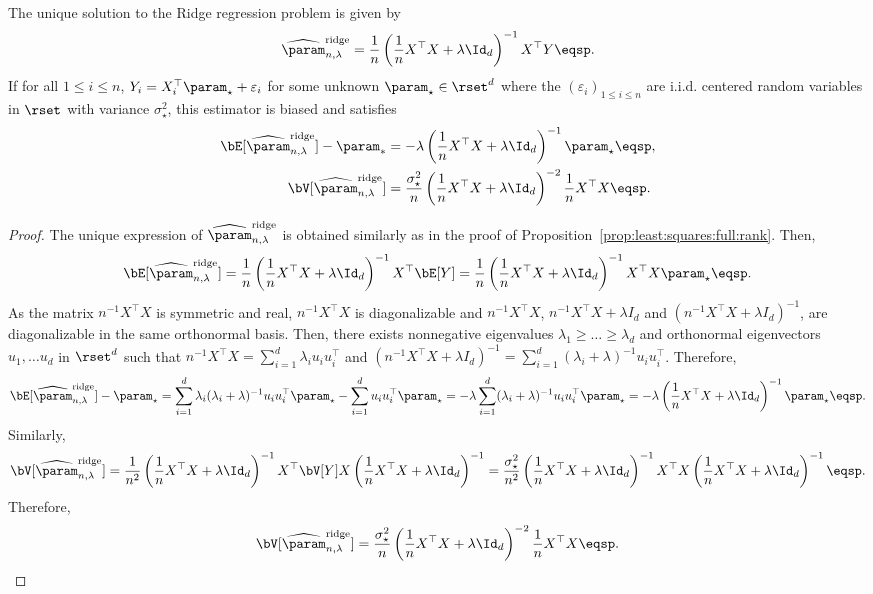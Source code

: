 \begin{shaded}
\begin{proposition}
\label{prop:least:squares:ridge}
The unique solution to the Ridge regression problem is given by
\[
\widehat \param^{\mathrm{ridge}}_{n,\lambda} = \frac{1}{n}\left(\frac{1}{n}X^\top X + \lambda \Id_d\right)^{-1}X^\top Y\eqsp.
\] 
If for all $1\leqslant i \leqslant n$, $Y_i = X^\top_i \param_{\star} + \varepsilon_i$ for some unknown $\param_\star\in\rset^d$ where the $(\varepsilon_i)_{1\leqslant i\leqslant n}$ are i.i.d. centered random variables in $\rset$ with variance $\sigma_\star^2$, this estimator is biased and satisfies 
\begin{align*}
\bE[\widehat \param^{\mathrm{ridge}}_{n,\lambda} ] - \param_*&= - \lambda\left(\frac{1}{n}X^\top X + \lambda \Id_d\right)^{-1}\param_\star\eqsp,\\
\bV[\widehat \param^{\mathrm{ridge}}_{n,\lambda} ] &= \frac{\sigma_\star^{2}}{n}\left(\frac{1}{n}X^\top X + \lambda \Id_d\right)^{-2}\frac{1}{n}X^\top X\eqsp.
\end{align*}
\end{proposition}
\end{shaded}
\begin{proof}
The unique expression of $\widehat \param^{\mathrm{ridge}}_{n,\lambda} $ is obtained similarly as in the proof of Proposition~\ref{prop:least:squares:full:rank}. Then,
$$
\bE[\widehat \param^{\mathrm{ridge}}_{n,\lambda}] =  \frac{1}{n}\left (\frac{1}{n}X^\top X + \lambda  \Id_d \right)^{-1}X^\top \bE[Y] =  \frac{1}{n}\left(\frac{1}{n} X^\top X + \lambda  \Id_d\right )^{-1}X^\top X\param_\star \eqsp.
$$
As the matrix $n^{-1}X^\top X$ is symmetric and real,  $ n^{-1}X^\top X$ is diagonalizable and $n^{-1}X^\top X$, $n^{-1}X^\top X + \lambda I_d$ and $(n^{-1} X^\top X + \lambda I_d)^{-1}$, are diagonalizable in the same orthonormal basis. Then, there exists nonnegative eigenvalues $\lambda_1\geqslant \ldots \geqslant \lambda_d$ and orthonormal eigenvectors $u_1, \ldots u_d$ in $\rset^d$ such that $n^{-1} X^\top X = \sum_{i=1}^d \lambda_i u_i u_i^\top$ and $(n^{-1}X^\top X + \lambda I_d)^{-1} = \sum_{i=1}^d (\lambda_i + \lambda)^{-1}u_i u_i^\top$. Therefore, 
$$
\bE[\widehat \param^{\mathrm{ridge}}_{n,\lambda}] -\param_\star=  \sum_{i=1}^d \lambda_i(\lambda_i + \lambda)^{-1}u_i u_i^\top\param_\star -  \sum_{i=1}^d u_i u_i^\top\param_\star =  - \lambda  \sum_{i=1}^d (\lambda_i + \lambda)^{-1}u_i u_i^\top\param_\star = - \lambda\left(\frac{1}{n}X^\top X + \lambda \Id_d\right)^{-1}\param_\star\eqsp.
$$
Similarly,
$$
\bV[\widehat \param^{\mathrm{ridge}}_{n,\lambda}]  =  \frac{1}{n^2}\left(\frac{1}{n}X^\top X + \lambda \Id_d\right)^{-1}X^\top \bV[Y]X  \left(\frac{1}{n}X^\top X + \lambda \Id_d\right)^{-1} = \frac{\sigma_\star^{2}}{n^2}\left(\frac{1}{n}X^\top X + \lambda \Id_d\right)^{-1}X^\top X  \left(\frac{1}{n}X^\top X + \lambda \Id_d\right)^{-1}\eqsp.
$$
Therefore,
$$
\bV[\widehat \param^{\mathrm{ridge}}_{n,\lambda}]  =   \frac{\sigma_\star^{2}}{n}\left(\frac{1}{n}X^\top X + \lambda \Id_d\right)^{-2}\frac{1}{n}X^\top X\eqsp.
$$
\end{proof}
